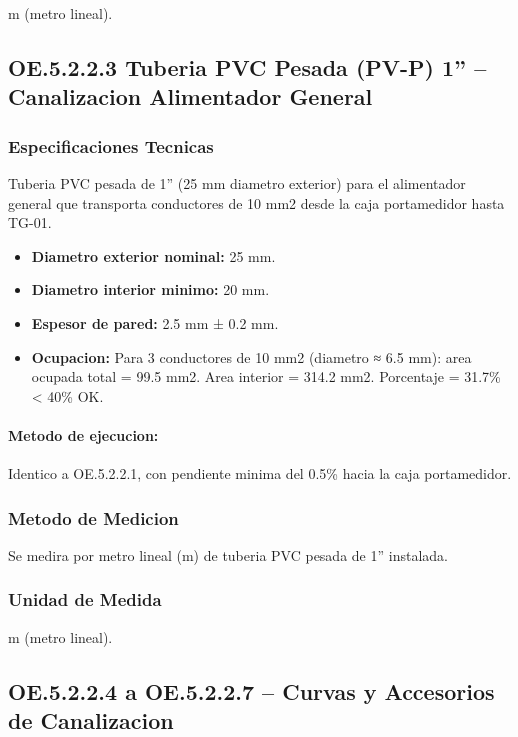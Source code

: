 m (metro lineal).

\subsection{OE.5.2.2.3 Tuberia PVC Pesada (PV-P) 1'' -- Canalizacion Alimentador General}

\subsubsection{Especificaciones Tecnicas}

Tuberia PVC pesada de 1'' (25 mm diametro exterior) para el alimentador general que transporta conductores de 10 mm2 desde la caja portamedidor hasta TG-01.

\begin{itemize}[nosep]
  \item \textbf{Diametro exterior nominal:} 25 mm.
  \item \textbf{Diametro interior minimo:} 20 mm.
  \item \textbf{Espesor de pared:} 2.5 mm ± 0.2 mm.
  \item \textbf{Ocupacion:} Para 3 conductores de 10 mm2 (diametro ≈ 6.5 mm): area ocupada total = 99.5 mm2. Area interior = 314.2 mm2. Porcentaje = 31.7\% < 40\% OK.
\end{itemize}

\paragraph{Metodo de ejecucion:} Identico a OE.5.2.2.1, con pendiente minima del 0.5\% hacia la caja portamedidor.

\subsubsection{Metodo de Medicion}

Se medira por metro lineal (m) de tuberia PVC pesada de 1'' instalada.

\subsubsection{Unidad de Medida}

m (metro lineal).

\subsection{OE.5.2.2.4 a OE.5.2.2.7 -- Curvas y Accesorios de Canalizacion}

